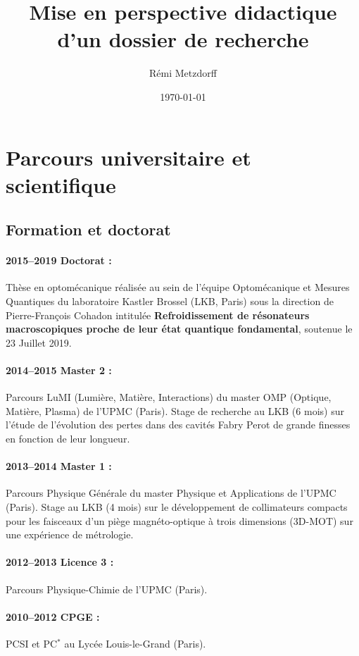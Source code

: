 \documentclass[12pt,a4paper]{article}
\title{Mise en perspective didactique d'un dossier de recherche}
\author{Rémi Metzdorff}
\date{\today}
\begin{document}
\maketitle

\section{Parcours universitaire et scientifique}

\subsection{Formation et doctorat}

\paragraph{2015--2019 Doctorat :}
Thèse en optomécanique réalisée au sein de l'équipe Optomécanique et Mesures Quantiques du laboratoire Kastler Brossel (LKB, Paris) sous la direction de Pierre-François Cohadon intitulée \textbf{Refroidissement de résonateurs macroscopiques proche de leur état quantique fondamental}, soutenue le 23 Juillet 2019.

\paragraph{2014--2015 Master 2 :}
Parcours LuMI (Lumière, Matière, Interactions) du master OMP (Optique, Matière, Plasma) de l'UPMC (Paris).
Stage de recherche au LKB (6 mois) sur l'étude de l'évolution des pertes dans des cavités Fabry Perot de grande finesses en fonction de leur longueur.

\paragraph{2013--2014 Master 1 :}
Parcours Physique Générale du master Physique et Applications de l'UPMC (Paris).
Stage au LKB (4 mois) sur le développement de collimateurs compacts pour les faisceaux d'un piège magnéto-optique à trois dimensions (3D-MOT) sur une expérience de métrologie.

\paragraph{2012--2013 Licence 3 :}
Parcours Physique-Chimie de l'UPMC (Paris).

\paragraph{2010--2012 CPGE :} PCSI et PC$^*$ au Lycée Louis-le-Grand (Paris).
\end{document}

